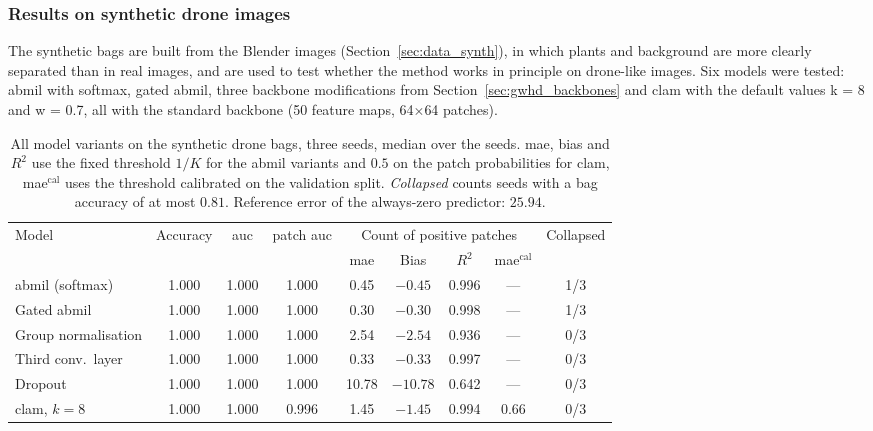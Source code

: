 \documentclass[12pt,parskip = half, DIV=classic,listof=totoc]{scrartcl}
\begin{document}
			\subsubsection{Results on synthetic drone images}
			The synthetic bags are built from the Blender images (Section~\ref{sec:data_synth}), in which plants 
			and background are more clearly separated than in real images, and are used 
			to test whether the method works in principle on drone-like images. Six models 
			were tested: \ac{abmil} with softmax, gated \ac{abmil}, three backbone modifications from 
			Section~\ref{sec:gwhd_backbones} and \ac{clam} with the default values k = 8 and w = 0.7, all with the 
			standard backbone (50 feature maps, 64$\times$64 patches).

			\begin{table}[htbp]
				\centering
				\footnotesize
				\setlength{\tabcolsep}{4pt}
				\begin{tabular}{@{}lcccccccc@{}}
					\toprule
					\multirow{2}{*}{Model} & \multirow{2}{*}{Accuracy} & \multirow{2}{*}{\acs*{auc}} & \multirow{2}{*}{patch \acs*{auc}} & \multicolumn{4}{c}{Count of positive patches} & \multirow{2}{*}{Collapsed} \\
					\cmidrule(lr){5-8}
					& & & & \acs*{mae} & Bias & $R^2$ & \acs*{mae}$^{\text{cal}}$ & \\
					\midrule
					\acs*{abmil} (softmax) & 1.000 & 1.000 & 1.000 & 0.45 & $-0.45$ & 0.996 & --- & 1/3 \\
					Gated \acs*{abmil} & 1.000 & 1.000 & 1.000 & 0.30 & $-0.30$ & 0.998 & --- & 1/3 \\
					Group normalisation & 1.000 & 1.000 & 1.000 & 2.54 & $-2.54$ & 0.936 & --- & 0/3 \\
					Third conv.\ layer & 1.000 & 1.000 & 1.000 & 0.33 & $-0.33$ & 0.997 & --- & 0/3 \\
					Dropout & 1.000 & 1.000 & 1.000 & 10.78 & $-10.78$ & 0.642 & --- & 0/3 \\
					\acs*{clam}, $k=8$ & 1.000 & 1.000 & 0.996 & 1.45 & $-1.45$ & 0.994 & 0.66 & 0/3 \\
					\bottomrule
				\end{tabular}
				\caption[All model variants on the synthetic drone bags, three seeds, median over the seeds]{All model variants on the synthetic drone bags, three seeds, median over the seeds.
				\acs*{mae}, bias and $R^2$ use the fixed threshold $1/K$ for the \ac{abmil} variants and $0.5$
				on the patch probabilities for \ac{clam}, \acs*{mae}$^{\text{cal}}$ uses the threshold calibrated on the validation split.
				\emph{Collapsed} counts seeds with a bag accuracy of at most $0.81$. Reference error of the
				always-zero predictor: $25.94$.}
				\label{tab:drone_synth}
			\end{table}
\end{document}
